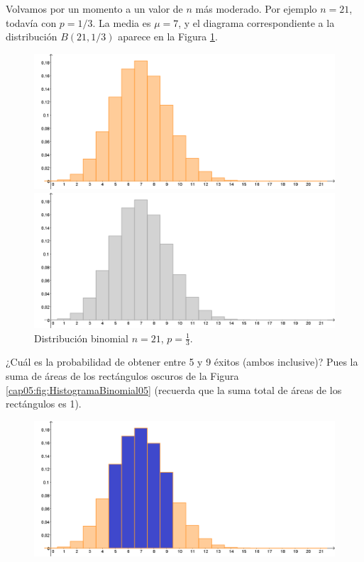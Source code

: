 \begin{ejemplo}
\label{cap05:ejem:DistribucionBinomialProbabilidadIntervalo01}
Volvamos por un momento a un valor de $n$ más moderado. Por ejemplo $n=21$, todavía con $p=1/3$. La media es $\mu=7$, y el diagrama correspondiente a la distribución $B(21,1/3)$ aparece en la Figura \ref{cap05:fig:HistogramaBinomial04}.
\begin{figure}[ht]
\begin{center}
\begin{enColor}
\includegraphics[width=12cm]{../fig/Cap05-HistogramaBinomial04.png}
\end{enColor}
\begin{bn}
\includegraphics[width=12cm]{../fig/Cap05-HistogramaBinomial04-bn.png}
\end{bn}
\caption{Distribución binomial $n=21$, $p=\frac{1}{3}$.}
\label{cap05:fig:HistogramaBinomial04}
\end{center}
\end{figure}
¿Cuál es la probabilidad de obtener entre 5 y 9 éxitos (ambos inclusive)? Pues la suma de áreas de los rectángulos oscuros de la Figura \ref{cap05:fig:HistogramaBinomial05} (recuerda que la suma total de áreas de los rectángulos es 1).
\begin{figure}[ht]
\begin{center}
\begin{enColor}
\includegraphics[width=12cm]{../fig/Cap05-HistogramaBinomial05.png}

\end{enColor}
\end{center}
\end{figure}
\end{ejemplo}
